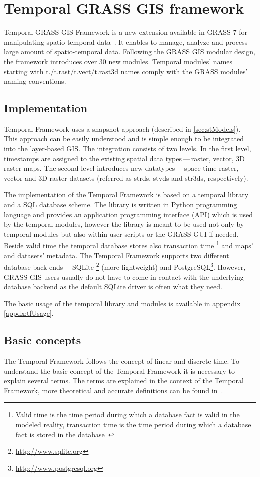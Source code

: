 \documentclass[a4paper,12pt,oneside]{book}
\newcommand{\tf}{Temporal Framework\xspace}
\newcommand{\dash}{\mbox{\,---\,}}
\begin{document}
\section{Temporal GRASS GIS framework}
\label{sec:GRASSTF}
Temporal GRASS GIS Framework is a new extension available in GRASS 7
for manipulating spatio-temporal data~\cite{soerenTGRASS}.
It enables to manage, analyze and process large amount of spatio-temporal data.
Following the GRASS GIS modular design, the framework introduces over 30 new modules.
Temporal modules' names starting with t./t.rast/t.vect/t.rast3d names
comply with the GRASS modules' naming conventions.

\subsection{Implementation}
\tf uses a snapshot approach (described in \ref{sec:stModels}).
This approach can be easily understood and is simple enough to be integrated into the layer-based GIS.
The integration consists of two levels.
In the first level, timestamps are assigned to the existing spatial data types\dash raster, vector, 3D raster maps.
The second level introduces new datatypes\dash space time raster,
vector and 3D raster datasets (referred as strds, stvds and str3ds, respectively).

The implementation of the \tf is based on a temporal library and a SQL database scheme.
The library is written in Python programming language and provides an application programming interface (API) which is used by the temporal modules,
however the library is meant to be used not only by temporal
modules but also within user scripts or the GRASS GUI if needed.
Beside valid time the temporal database stores also transaction time%
\footnote{Valid time is the time period during which a database fact is valid in the modeled reality,
transaction time  is the time period during which a database fact is stored in the database~\cite{temporalGlossary}}
and maps' and datasets' metadata.
The \tf supports two different database back-ends\dash SQLite%
\footnote{\url{http://www.sqlite.org}} (more lightweight) and
PostgreSQL\footnote{\url{http://www.postgresql.org}}.
However, GRASS GIS users usually do not have to come in contact with the underlying database backend
as the default SQLite driver is often what they need.

The basic usage of the temporal library and modules is available in appendix \ref{appdx:tfUsage}.

\subsection{Basic concepts}
The \tf follows the concept of linear and discrete time.
To understand the basic concept of the \tf it is necessary to explain several terms.
The terms are explained in the context of the \tf , more theoretical and accurate definitions can be found in~\cite{temporalGlossary}.
\end{document}
